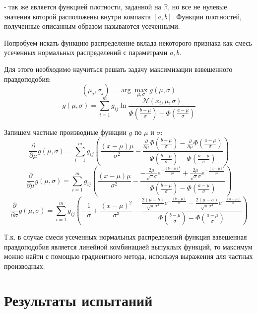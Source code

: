 \documentclass[12pt,a4paper]{report}
\begin{document}
 - так же является функцией плотности, заданной на $\mathbb{R}$, но все не нулевые значения которой расположены внутри компакта $[a, b]$. Функции плотностей, полученные описанным образом называются усеченными.
 
Попробуем искать функцию распределение вклада некоторого признака как смесь усеченных нормальных распределений с параметрами $a, b$.

Для этого необходимо научиться решать задачу максимизации взвешенного правдоподобия: 
\begin{equation*}
(\mu_j, \sigma_j) = \arg\max_{\mu, \sigma}g(\mu, \sigma) 
\end{equation*}
\begin{equation*}
g(\mu, \sigma) = \sum_{i=1}^{m}g_{ij}\ln\frac{\mathcal{N}(x_i, \mu, \sigma)}{\Phi(\frac{b-\mu}{\sigma}) - \Phi(\frac{a-\mu}{\sigma})}
\end{equation*}

Запишем частные производные функции $g$ по $\mu$ и $\sigma$:
\begin{equation*}
\frac{\partial}{\partial \mu}g(\mu, \sigma) = \sum_{i=1}^{m}g_{ij} ( \frac{(x - \mu) \mu}{\sigma^2} - \frac{\frac{\partial}{\partial \mu} \Phi(\frac{b-\mu}{\sigma}) - \frac{\partial}{\partial \mu} \Phi(\frac{a-\mu}{\sigma})}{\Phi(\frac{b-\mu}{\sigma}) - \Phi(\frac{a-\mu}{\sigma})} )
\end{equation*}
\begin{equation*}
\frac{\partial}{\partial \mu}g(\mu, \sigma) = \sum_{i=1}^{m}g_{ij} ( \frac{(x - \mu) \mu}{\sigma^2} - \frac{-\frac{2\mu}{\sqrt{\pi}\sigma}e^{-\frac{(b-\mu)^2}{\sigma^2}} + \frac{2\mu}{\sqrt{\pi}\sigma}e^{-\frac{(a-\mu)^2}{\sigma^2}}}{\Phi(\frac{b-\mu}{\sigma}) - \Phi(\frac{a-\mu}{\sigma})} )
\end{equation*}
\begin{equation*}
\frac{\partial}{\partial \sigma}g(\mu, \sigma) = \sum_{i=1}^{m}g_{ij} ( -\frac{1}{\sigma} + \frac{(x-\mu)^2}{\sigma^3} -\frac{\frac{2(\mu - b)}{\sqrt{\pi}\sigma^2}e^{-\frac{(b-\mu)}{\sigma}} - \frac{2(\mu - a)}{\sqrt{\pi}\sigma^2}e^{-\frac{(a-\mu)}{\sigma}}}{\Phi(\frac{b-\mu}{\sigma}) - \Phi(\frac{a-\mu}{\sigma})} )
\end{equation*}

Т.к. в случае смеси усеченных нормальных распределений функция взвешенная правдоподобия является линейной комбинацией выпуклых функций, то максимум можно найти с помощью градиентного метода, используя выражения для частных производных.

\chapter{Результаты испытаний}
\end{document}
